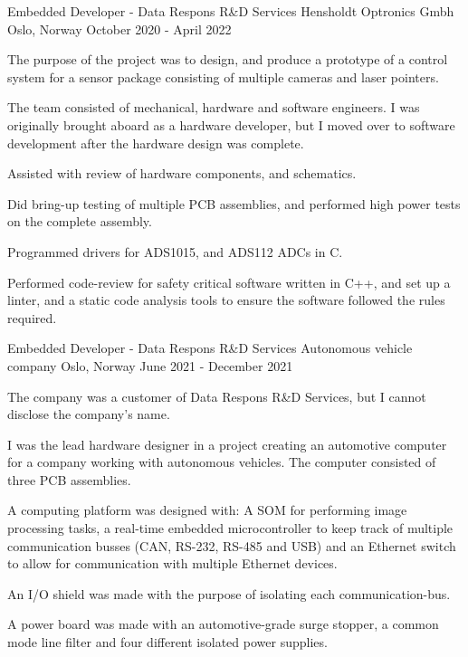  \cventry
        {Embedded Developer - Data Respons R\&D Services}
        {Hensholdt Optronics Gmbh}
        {Oslo, Norway}
        {October 2020 - April 2022}
        {      
          \begin{cvitems}
            \item {The purpose of the project was to design, and produce a prototype of a control system for a sensor package consisting of multiple cameras and laser pointers.}
            \item {The team consisted of mechanical, hardware and software engineers. I was originally brought aboard as a hardware developer, but I moved over to software development after the hardware design was complete.}
            \item {Assisted with review of hardware components, and schematics.}
            \item {Did bring-up testing of multiple PCB assemblies, and performed high power tests on the complete assembly.}
            \item {Programmed drivers for ADS1015, and ADS112 ADCs in C.}
            \item {Performed code-review for safety critical software written in C++, and set up a linter, and a static code analysis tools to ensure the software followed the rules required.}
          \end{cvitems}
        }
    \cventry
        {Embedded Developer - Data Respons R\&D Services}
        {Autonomous vehicle company}
        {Oslo, Norway}
        {June 2021 - December 2021}
        {      
          \begin{cvitems}
            \item {The company was a customer of Data Respons R\&D Services, but I cannot disclose the company's name.}
            \item {I was the lead hardware designer in a project creating an automotive computer for a company working with autonomous vehicles. The computer consisted of three PCB assemblies.}
            \item {A computing platform was designed with: A SOM for performing image processing tasks, a real-time embedded microcontroller to keep track of multiple communication busses (CAN, RS-232, RS-485 and USB) and an Ethernet switch to allow for communication with multiple Ethernet devices.}
            \item {An I/O shield was made with the purpose of isolating each communication-bus.}
            \item {A power board was made with an automotive-grade surge stopper, a common mode line filter and four different isolated power supplies.}
          \end{cvitems}
        }
